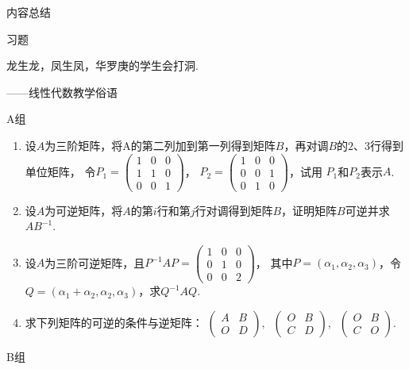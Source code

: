 \vspace{2ex}
\centerline{\heiti \Large 内容总结}

\vspace{2ex}

\centerline{\heiti \Large 习题}
\vspace{2ex}
{\kaishu 龙生龙，凤生凤，华罗庚的学生会打洞.}
\begin{flushright}
    \kaishu
    ——线性代数教学俗语
\end{flushright}
\centerline{\heiti A组}
\begin{enumerate}
    \item 设$A$为三阶矩阵，将A的第二列加到第一列得到矩阵$B$，再对调$B$的$2$、$3$行得到单位矩阵，
	令$P_1=\begin{pmatrix}1 & 0 & 0 \\ 1 & 1 & 0 \\ 0 & 0 & 1\end{pmatrix}$，
	$P_2=\begin{pmatrix}1 & 0 & 0 \\ 0 & 0 & 1 \\ 0 & 1 & 0\end{pmatrix}$，试用
	$P_1$和$P_2$表示$A$.
	\item 设$A$为可逆矩阵，将$A$的第$i$行和第$j$行对调得到矩阵$B$，证明矩阵$B$可逆并求$AB^{-1}$.
	\item 设$A$为三阶可逆矩阵，且$P^{-1}AP=\begin{pmatrix}1 & 0 & 0 \\ 0 & 1 & 0 \\ 0 & 0 & 2\end{pmatrix}$，
	其中$P=(\alpha_1,\alpha_2,\alpha_3)$，令$Q=(\alpha_1+\alpha_2,\alpha_2,\alpha_3)$，求$Q^{-1}AQ$.
    \item 求下列矩阵的可逆的条件与逆矩阵：
	$\begin{pmatrix}
		A & B \\ O & D
	\end{pmatrix},\ $
	$\begin{pmatrix}
		O & B \\ C & D
	\end{pmatrix},\ $
	$\begin{pmatrix}
		O & B \\ C & O	
	\end{pmatrix}$.
\end{enumerate}
\centerline{\heiti B组}
